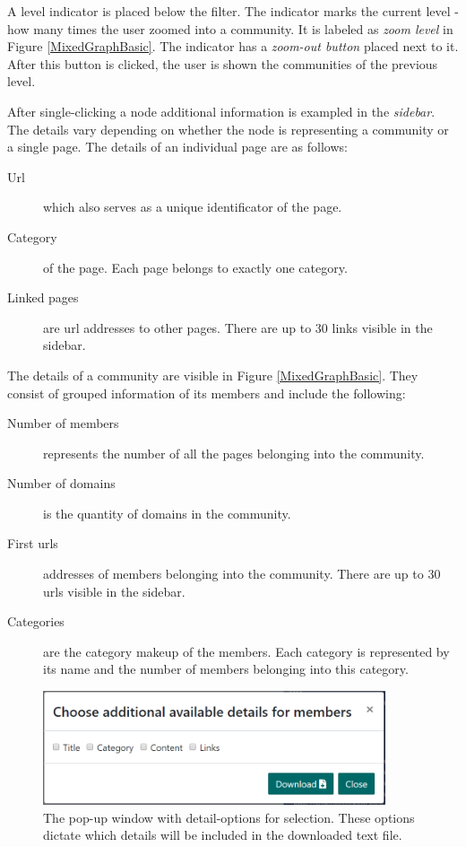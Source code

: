 A level indicator is placed below the filter. The indicator marks the current level - how many times the user zoomed into a community. It is labeled as \textit{zoom level} in Figure \ref{MixedGraphBasic}. The indicator has a \textit{zoom-out button} placed next to it. After this button is clicked, the user is shown the communities of the previous level.

After single-clicking a node additional information is exampled in the \textit{sidebar}. The details vary depending on whether the node is representing a community or a single page.
The details of an individual page are as follows: 
\begin {description}
	\item [Url] which also serves as a unique identificator of the page. 
	\item [Category] of the page. Each page belongs to exactly one category.
	\item[Linked pages] are url addresses to other pages. There are up to 30 links visible in the sidebar. 
\end{description}

The details of a community are visible in Figure \ref{MixedGraphBasic}. They consist of grouped information of its members and include the following:
\begin {description}
	\item[Number of members] represents the number of all the pages belonging into the community. 
	\item [Number of domains] is the quantity of domains in the community.
	\item [First urls] addresses of members belonging into the community. There are up to 30 urls visible in the sidebar. 
	\item [Categories] are the category makeup of the members. Each category is represented by its name and the number of members belonging into this category.
\end{description}

\begin{figure}[ht!]
  \centering
  \includegraphics[width=0.9\textwidth]{Images/options_popup.png}
  \caption{The pop-up window with detail-options for selection. These options dictate which details will be included in the downloaded text file.}
  \label{detailsOptionsPopup}
\end{figure} 

